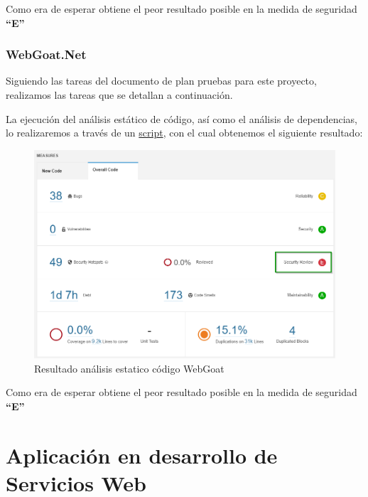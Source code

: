 Como era de esperar obtiene el peor resultado posible en la medida de seguridad \textbf{“E”}\\

\newpage
\subsubsection{WebGoat.Net}
Siguiendo las tareas del documento de plan pruebas para este proyecto, realizamos las tareas que se detallan a continuación.

La ejecución del análisis estático de código, así como el análisis de dependencias, lo realizaremos a través de un 
\href{https://github.com/M0l1n3ta/PFG/blob/master/Scripts/STAT/RunSonarScaner_WebGoat.NET.ps1}{script}, con el cual obtenemos
el siguiente resultado:
\begin{figure}[h!]  
    \includegraphics[width=\linewidth]{./imagenes/10_AnalisisEstatico_WebGoat.Net.png}
    \caption{Resultado análisis estatico código WebGoat}  
    \label{fig:26}
\end{figure}
Como era de esperar obtiene el peor resultado posible en la medida de seguridad \textbf{“E”}

\newpage
\section{Aplicación en desarrollo de Servicios Web} 

